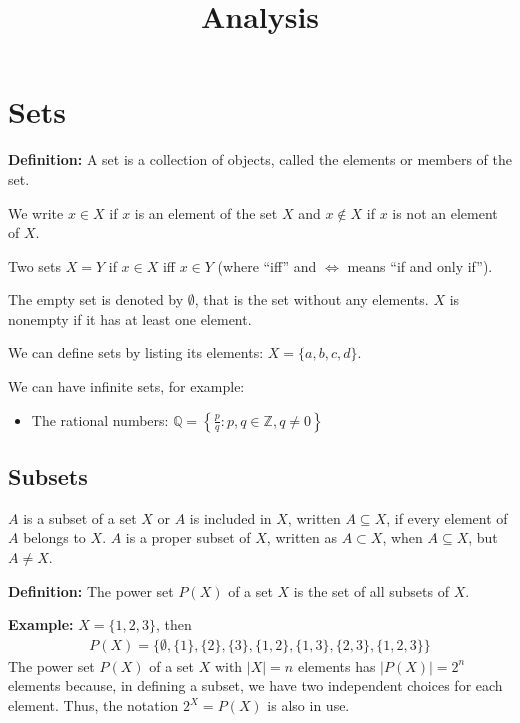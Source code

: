 \documentclass{article}
\begin{document}
\title{Analysis}
\date{}
\maketitle

\newpage
\tableofcontents

\newpage
\section{Sets}

\textbf{Definition:} A set is a collection of objects, called the elements or members of the set. 

We write $x \in X$ if $x$ is an element of the set $X$ and $x \notin X$ if $x$ is not an element of $X$.

Two sets $X = Y$ if $x \in X$ iff $x \in Y$ (where ``iff'' and $\iff$ means ``if and only if'').

The empty set is denoted by $\emptyset$, that is the set without any elements. $X$ is nonempty if it has at least one element.

We can define sets by listing its elements: $X = \{a, b, c, d\}$. 

We can have infinite sets, for example:
\begin{itemize}
    \item The rational numbers: $\mathbb{Q} = \left\{\frac{p}{q} : p, q \in \mathbb{Z}, q \neq 0\right\}$
\end{itemize}

\subsection{Subsets}
$A$ is a subset of a set $X$ or $A$ is included in $X$, written $A \subseteq X$, if every element of $A$ belongs to $X$. $A$ is a proper subset of $X$, written as $A \subset X$, when $A \subseteq X$, but $A \ne X$. 

\textbf{Definition:} The power set $P(X)$ of a set $X$ is the set of all subsets of $X$. 

\textbf{Example:} $X = \{1,2,3\}$, then 
\begin{align*}
P(X) = \{\emptyset, \{1\}, \{2\}, \{3\}, \{1,2\}, \{1,3\}, \{2,3\}, \{1,2,3\}\}
\end{align*} The power set $P(X)$ of a set $X$ with $|X| = n$ elements has $|P(X)|= 2^n$ elements because, in defining a subset, we have two independent choices for each element. Thus, the notation $2^X = P(X)$ is also in use.
\end{document}
